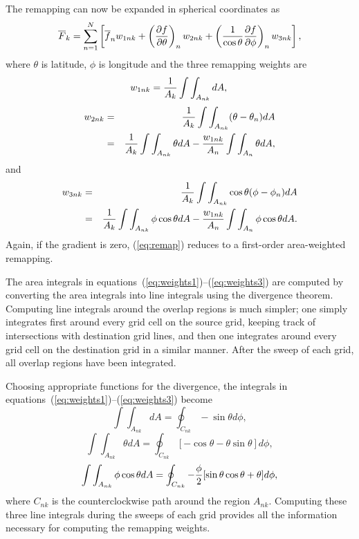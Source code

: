 \documentclass[12pt]{report}
\begin{document}
The remapping can now be expanded in spherical coordinates as
\begin{equation}\label{eq:remap}
\overline{F}_k = \sum_{n=1}^{N} \left[\overline{f}_n w_{1nk} +
\left({{\partial f}\over{\partial \theta}}\right)_n w_{2nk} +
\left({1\over{\cos\theta}}{{\partial f}\over{\partial \phi}}\right)_n w_{3nk}
\right],
\end{equation}
where $\theta$ is latitude, $\phi$ is longitude and the
three remapping weights are
\begin{equation}\label{eq:weights1}
w_{1nk} = {1\over{A_k}}\int\int_{A_{nk}}dA, \\
\end{equation}
\begin{eqnarray}\label{eq:weights2}
w_{2nk} & = & {1\over{A_k}}\int\int_{A_{nk}}(\theta-\theta_n)dA \nonumber \\
        & = & {1\over{A_k}}\int\int_{A_{nk}}\theta dA -
              {{w_{1nk}}\over{A_n}}\int\int_{A_n}\theta dA,
\end{eqnarray}
and
\begin{eqnarray}\label{eq:weights3}
w_{3nk} & = & {1\over{A_k}}\int\int_{A_{nk}}\cos\theta(\phi-\phi_n)dA \nonumber \\
        & = & {1\over{A_k}}\int\int_{A_{nk}}\phi\cos\theta dA -
              {{w_{1nk}}\over{A_n}}\int\int_{A_n}\phi\cos\theta dA .
\end{eqnarray}
Again, if the gradient is zero, ({\ref{eq:remap}})
reduces to a first-order area-weighted remapping.

The area integrals in
equations~(\ref{eq:weights1})--(\ref{eq:weights3})
are computed by converting the area integrals into line
integrals using the divergence theorem.
Computing line integrals around the overlap regions
is much simpler; one simply integrates first around every
grid cell on the source grid, keeping track of intersections
with destination grid lines, and then one integrates around every
grid cell on the destination grid in a similar manner.  After
the sweep of each grid, all overlap regions have been
integrated.

Choosing appropriate functions for the divergence, the integrals
in equations~(\ref{eq:weights1})--(\ref{eq:weights3}) become
\begin{equation}
\int\int_{A_{nk}}dA = \oint_{C_{nk}} -\sin\theta d\phi,
\end{equation}
\begin{equation}
\int\int_{A_{nk}}\theta dA =
 \oint_{C_{nk}} [-\cos\theta-\theta\sin\theta]d\phi,
\end{equation}
\begin{equation}
\int\int_{A_{nk}}\phi\cos\theta dA =
\oint_{C_{nk}} -{\phi\over 2}[\sin\theta\cos\theta + \theta]d\phi,
\end{equation}
where $C_{nk}$ is the counterclockwise path around the region
$A_{nk}$.  Computing these three line integrals during the
sweeps of each grid provides all the information necessary
for computing the remapping weights.
\end{document}
